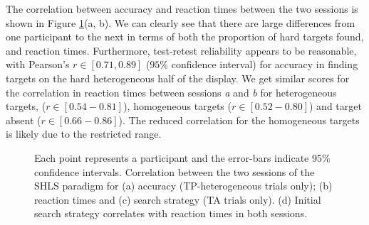 \documentclass[]{rsos}%
\begin{document}
The correlation between accuracy and reaction times between the two sessions is shown in Figure \ref{fig:splithalf_summary}(a, b). We can clearly see that there are large differences from one participant to the next in terms of both the proportion of hard targets found, and reaction times. Furthermore, test-retest reliability appears to be reasonable, with Pearson's $r \in [0.71, 0.89]$ ($95\%$ confidence interval) for accuracy in finding targets on the hard heterogeneous half of the display. We get similar scores for the correlation in reaction times between sessions \textit{a} and \textit{b} for heterogeneous targets, ($r \in [0.54-0.81]$), homogeneous targets ($r \in [0.52-0.80]$) and target absent ($r \in [0.66-0.86]$). The reduced correlation for the homogeneous targets is likely due to the restricted range.

\begin{figure}
\centering
{}
\caption{Each point represents a participant and the error-bars indicate 95\% confidence intervals. Correlation between the two sessions of the SHLS paradigm for (a)  accuracy (TP-heterogeneous trials only); (b) reaction times and (c) search strategy (TA trials only). (d) Initial search strategy correlates with reaction times in both sessions. }
\label{fig:splithalf_summary}
\end{figure}
\end{document}
